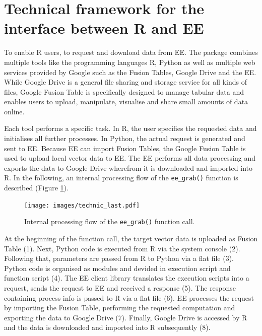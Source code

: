 \section{Technical framework for the interface between R and EE}

To enable R users, to request and download data from EE. The package combines multiple tools like the programming languages R, Python as well as multiple web services provided by Google such as the Fusion Tables, Google Drive and the EE. While Google Drive is a general file sharing and storage service for all kinds of files, Google Fusion Table is specifically designed to manage tabular data and enables users to upload, manipulate, visualise and share small amounts of data online.

Each tool performs a specific task. In R, the user specifies the requested data and initialises all further processes. In Python, the actual request is generated and sent to EE. Because EE can import Fusion Tables, the Google Fusion Table is used to upload local vector data to EE. The EE performs all data processing and exports the data to Google Drive wherefrom it is downloaded and imported into R. 
In the following, an internal processing flow of the \texttt{ee\_grab()} function is described (Figure \ref{processingFlow}).
\begin{center}
	\begin{figure}[h]
		\begin{center}
			\texttt{[image: images/technic\_last.pdf]}
			\caption{Internal processing flow of the \texttt{ee\_grab()} function call.}
			\label{processingFlow}
		\end{center}
	\end{figure}
\end{center}


At the beginning of the function call, the target vector data is uploaded as Fusion Table (1). Next, Python code is executed from R via the system console (2). 
Following that, parameters are passed from R to Python via a flat file (3). Python code is organised as modules and devided in execution script and function script (4). The EE client library translates the execution scripts into a request, sends the request to EE  and received a response (5). The response containing process info is passed to R via a flat file (6). EE processes the request by importing the Fusion Table, performing the requested computation and exporting the data to Google Drive (7).
Finally, Google Drive is accessed by R and the data is downloaded and imported into R subsequently (8).

